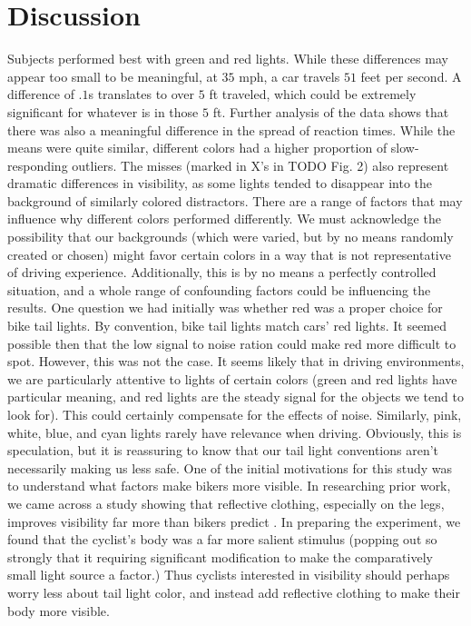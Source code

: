 \section{Discussion}

Subjects performed best with green and red lights. While these differences
may appear too small to be meaningful, at $35$ mph, a car travels $51$ feet per
second. A difference of $.1$s translates to over $5$ ft traveled, which could
be extremely significant for whatever is in those $5$ ft.  Further analysis
of the data shows that there was also a meaningful difference in the spread
of reaction times. While the means were quite similar, different colors had
a higher proportion of slow-responding outliers. The misses (marked in X's
in TODO Fig. 2) also represent dramatic differences in visibility, as some
lights tended to disappear into the background of similarly colored
distractors.  There are a range of factors that may influence why different
colors performed differently. We must acknowledge the possibility that our
backgrounds (which were varied, but by no means randomly created or chosen)
might favor certain colors in a way that is not representative of driving
experience. Additionally, this is by no means a perfectly controlled
situation, and a whole range of confounding factors could be influencing
the results.  One question we had initially was whether red was a proper
choice for bike tail lights. By convention, bike tail lights match cars'
red lights. It seemed possible then that the low signal to noise ration
could make red more difficult to spot. However, this was not the case. It
seems likely that in driving environments, we are particularly attentive to
lights of certain colors (green and red lights have particular meaning, and
red lights are the steady signal for the objects we tend to look for). This
could certainly compensate for the effects of noise. Similarly, pink,
white, blue, and cyan lights rarely have relevance when driving. Obviously,
this is speculation, but it is reassuring to know that our tail light
conventions aren't necessarily making us less safe.  One of the initial
motivations for this study was to understand what factors make bikers more
visible. In researching prior work, we came across a study showing that
reflective clothing, especially on the legs, improves visibility far more
than bikers predict \cite{wood2013bicyclists}. In preparing the experiment, we found
that the cyclist's body was a far more salient stimulus (popping out so
strongly that it requiring significant modification to make the
comparatively small light source a factor.) Thus cyclists interested in
visibility should perhaps worry less about tail light color, and instead
add reflective clothing to make their body more visible.

